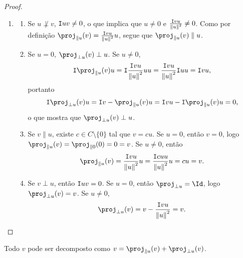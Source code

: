 \begin{proof}
\begin{enumerate}

	\item	
		\begin{enumerate}
		\item Se $u \not\perp v$, $\mathtt I{u}{v} \neq 0$, o que implica que $u \neq 0$ e $\frac{\mathtt I{v}{u}}{\left\Vert{u}\right\Vert^2} \neq 0$. Como por definição $\proj_{\parallel u}(v) = \frac{\inte{v}{u}}{\nor{u}^2}u$, segue que $\proj_{\parallel u}(v) \parallel u$.
		
		\item Se $u = 0$, $\proj_{\perp u}(v) \perp u$. Se $u \neq 0$,
	\begin{align*}
	\inte{\proj_{\parallel u}(v)}{u} = \inte{\frac{\inte{v}{u}}{\nor{u}^2}u}{u} = \frac{\inte{v}{u}}{\nor{u}^2}\inte{u}{u} = \inte{v}{u},
	\end{align*}
portanto
	\begin{align*}
	\inte{\proj_{\perp u}(v)}{u} = \inte{v - \proj_{\parallel u}(v)}{u} = \inte{v}{u} - \inte{\proj_{\parallel u}(v)}{u} = 0,
	\end{align*}
o que mostra que $\proj_{\perp u}(v) \perp u$.
		
		\item Se $v \parallel u$, existe $c \in C \setminus \{0\}$ tal que $v = cu$. Se $u = 0$, então $v=0$, logo $\proj_{\parallel u}(v) = \proj_{\parallel 0}(0) = 0 = v$. Se $u \neq 0$, então
		\begin{equation*}
		\proj_{\parallel u}(v) = \frac{\inte{v}{u}}{\nor{u}^2}u = \frac{\inte{cu}{u}}{\nor{u}^2}u = cu = v.
		\end{equation*}
		
		\item Se $v \perp u$, então $\mathtt I{u}{v}=0$. Se $u=0$, então $\proj_{\perp u} = \Id$, logo $\proj_{\perp u}(v) = v$. Se $u \neq 0$,
	\begin{equation*}
	\proj_{\perp u}(v) = v - \frac{\inte{v}{u}}{\nor{u}^2} = v.
	\end{equation*}
		\end{enumerate}
	\end{enumerate}
\end{proof}

Todo $v$ pode ser decomposto como $v = \proj_{\parallel u}(v) + \proj_{\perp u}(v)$.

